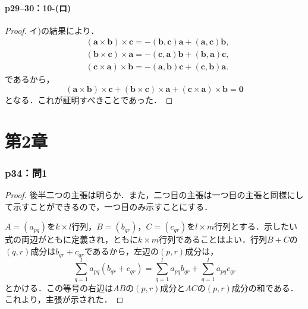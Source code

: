 \documentclass[a4paper,10pt,fleqn]{ltjsarticle}
\begin{document}
\subsection*{p29--30：10-(ロ)}

\begin{tleftbar}
    \begin{proof}
        イ)の結果により．
        \begin{align*}
             & (\bm{a}\times\bm{b}) \times \bm{c} =  -(\bm{b},\bm{c})\bm{a}+(\bm{a},\bm{c}) \bm{b} ,    \\
             & (\bm{b} \times \bm{c} ) \times \bm{a} = -(\bm{c},\bm{a}) \bm{b} +(\bm{b},\bm{a}) \bm{c}, \\
             & (\bm{c} \times \bm{a} ) \times \bm{b} = -(\bm{a},\bm{b}) \bm{c} +(\bm{c},\bm{b}) \bm{a}.
        \end{align*}
        であるから，
        \[
            (\bm{a}\times\bm{b}) \times \bm{c} + (\bm{b} \times \bm{c} ) \times \bm{a}+(\bm{c} \times \bm{a} ) \times \bm{b} =\bm{0}
        \]
        となる．これが証明すべきことであった．
    \end{proof}
\end{tleftbar}


\part*{第2章}


\section*{p34：問1}

\begin{tleftbar}
    \begin{proof}
        後半二つの主張は明らか．また，二つ目の主張は一つ目の主張と同様にして示すことができるので，一つ目のみ示すことにする．


        $A=(a_{pq})$を$k \times l$行列，$B= (b_{qr})$，$C=(c_{qr})$を$l \times m$行列とする．示したい式の両辺がともに定義され，ともに$k \times m$行列であることはよい．行列$B+C$の$(q,r)$成分は$b_{qr}+c_{qr}$であるから，左辺の$(p,r)$成分は，
        \[
            \sum_{q=1}^{l}a_{pq}\left(b_{qr}+c_{qr}\right)=\sum_{q=1}^{l}a_{pq}b_{qr}+\sum_{q=1}^{l}a_{pq}c_{qr}
        \]
        とかける．この等号の右辺は$AB$の$(p,r)$成分と$AC$の$(p,r)$成分の和である．これより，主張が示された．
    \end{proof}
\end{tleftbar}
\end{document}
